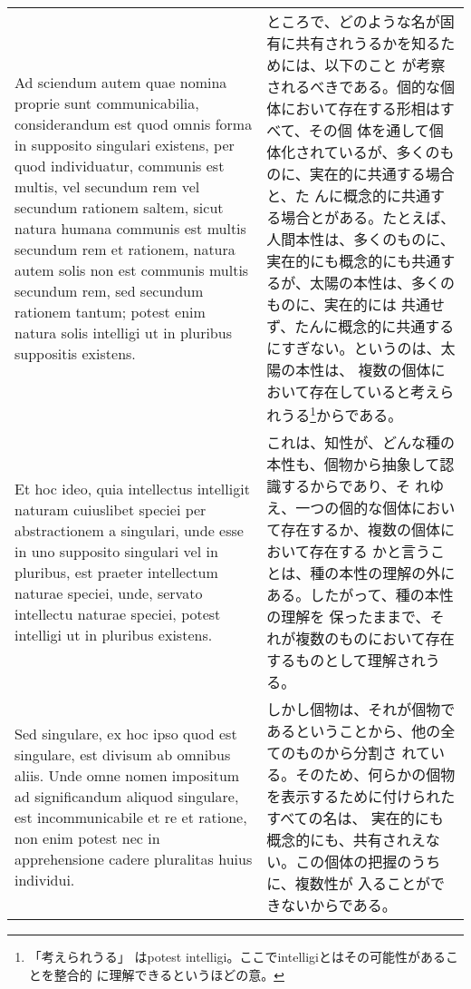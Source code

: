 \documentclass[10pt]{jsarticle} %
\begin{document}
\begin{longtable}{p{21em}p{21em}}
\\

Ad sciendum autem quae nomina proprie sunt communicabilia, considerandum
est quod omnis forma in supposito singulari existens, per quod
individuatur, communis est multis, vel secundum rem vel secundum
rationem saltem, sicut natura humana communis est multis secundum rem et
rationem, natura autem solis non est communis multis secundum rem, sed
secundum rationem tantum; potest enim natura solis intelligi ut in
pluribus suppositis existens. 
&

ところで、どのような名が固有に共有されうるかを知るためには、以下のこと
が考察されるべきである。個的な個体において存在する形相はすべて、その個
体を通して個体化されているが、多くのものに、実在的に共通する場合と、た
んに概念的に共通する場合とがある。たとえば、人間本性は、多くのものに、
実在的にも概念的にも共通するが、太陽の本性は、多くのものに、実在的には
共通せず、たんに概念的に共通するにすぎない。というのは、太陽の本性は、
複数の個体において存在していると考えられうる\footnote{「考えられうる」
 はpotest intelligi。ここでintelligiとはその可能性があることを整合的
に理解できるというほどの意。}からである。


\\


Et hoc ideo, quia intellectus intelligit naturam cuiuslibet speciei
per abstractionem a singulari, unde esse in uno supposito singulari
vel in pluribus, est praeter intellectum naturae speciei, unde,
servato intellectu naturae speciei, potest intelligi ut in pluribus
existens. 

&

これは、知性が、どんな種の本性も、個物から抽象して認識するからであり、そ
 れゆえ、一つの個的な個体において存在するか、複数の個体において存在する
 かと言うことは、種の本性の理解の外にある。したがって、種の本性の理解を
 保ったままで、それが複数のものにおいて存在するものとして理解されうる。


\\

Sed singulare, ex hoc ipso quod est singulare, est divisum
ab omnibus aliis. Unde omne nomen impositum ad significandum aliquod
singulare, est incommunicabile et re et ratione, non enim potest nec
in apprehensione cadere pluralitas huius individui. 

&

しかし個物は、それが個物であるということから、他の全てのものから分割さ
れている。そのため、何らかの個物を表示するために付けられたすべての名は、
実在的にも概念的にも、共有されえない。この個体の把握のうちに、複数性が
入ることができないからである。


\end{longtable}
\end{document}

